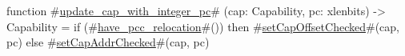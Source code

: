 function #\hyperref[sailRISCVzupdatezycapzywithzyintegerzypc]{update\_cap\_with\_integer\_pc}# (cap: Capability, pc: xlenbits) -> Capability = {
  if (#\hyperref[sailRISCVzhavezypcczyrelocation]{have\_pcc\_relocation}#()) then #\hyperref[sailRISCVzsetCapOffsetChecked]{setCapOffsetChecked}#(cap, pc) else #\hyperref[sailRISCVzsetCapAddrChecked]{setCapAddrChecked}#(cap, pc)
}
